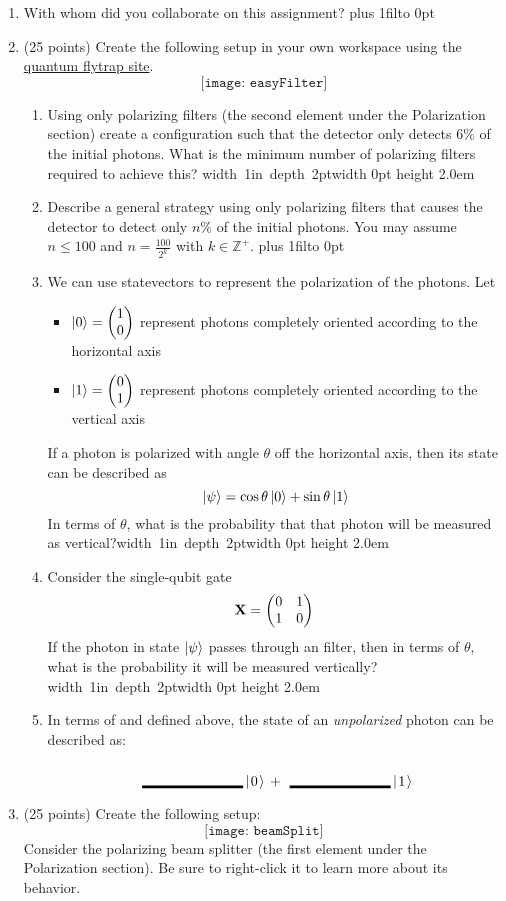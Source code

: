 \documentclass[12pt]{article}
\newcommand{\Blank}{\mbox{\hskip 4pt\vrule width 1in depth 2pt}\vrule width 0pt height 2.0em}
\def\DefaultSpace{1in}
\newcommand{\LeaveSpace}[1][\DefaultSpace]{%
\vskip #1 plus 1fil\relax\hbox to 0pt{\hss} %
}
\begin{document}
\begin{enumerate}[font=\bfseries]
    \item With whom did you collaborate on this assignment?
    \LeaveSpace{}
    \item (25 points) Create the following setup in your own workspace using the \href{https://lab.quantumflytrap.com/lab}{quantum flytrap site}.
    \[\texttt{[image: easyFilter]}\]
    \begin{enumerate}[label=\theenumi.\arabic*]
        \item Using only polarizing filters (the second element under the Polarization section) create a configuration such that the detector only detects 6$\%$ of the initial photons. What is the minimum number of polarizing filters required to achieve this? \Blank{}
        \clearpage{}
        \item Describe a general strategy using only polarizing filters that causes the detector to detect only $n\%$ of the initial photons. You may assume $n \leq 100$ and $n = \frac{100}{2^k}$ with $k\in\mathbb{Z}^+$.\LeaveSpace[2in]{}
        \item We can use statevectors to represent the polarization of the photons. Let 
        \begin{itemize}
          \item $\ket{0} =\SQB{1}{0}$ represent photons completely oriented according to the horizontal axis
          \item $\ket{1} = \SQB{0}{1}$ represent photons completely oriented according to the vertical axis
        \end{itemize}
        If a photon is polarized with angle $\theta$ off the horizontal axis, then its state can be described as
        \[ \ket{\psi} = \cos{\theta}\ket{0} + \sin{\theta}\ket{1}\] 
        In terms of $\theta$, what is the probability that that photon will be measured as vertical?\Blank{}
       \item Consider the single-qubit gate
       \[ \PauliX = \XMatrix{} \]
       If the photon in state $\ket{\psi}$ passes through an \PauliX{} filter, then in terms
       of $\theta$, what is the probability it will be measured vertically?\Blank{}
        \item In terms of \QZero{} and \QOne{} defined above, the state of an \emph{unpolarized} photon can be described as:
        \[ \Blank{}\QZero{} + \Blank{}\QOne{} \]
    \end{enumerate}
    \item (25 points) Create the following setup:
    \[\texttt{[image: beamSplit]}\]
    Consider the polarizing beam splitter (the first element under the Polarization section). Be sure to right-click it to learn more about its behavior.
    

\end{enumerate}
\end{document}
